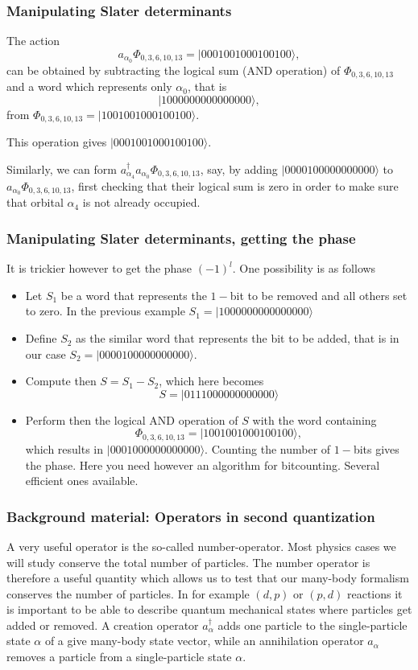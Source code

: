 \documentclass[compress]{beamer}
\begin{document}
\frame
{
  \frametitle{Manipulating Slater determinants}
\begin{small}
{\scriptsize
The action
\[
a_{\alpha_0}\Phi_{0,3,6,10,13} = |0001001000100100\rangle,
\]
can be obtained by subtracting the logical sum (AND operation) of $\Phi_{0,3,6,10,13}$ and 
a word which represents only $\alpha_0$, that is
\[
|1000000000000000\rangle,
\]  
from $\Phi_{0,3,6,10,13}= |1001001000100100\rangle$.

This operation gives $|0001001000100100\rangle$. 

Similarly, we can form $a^\dagger_{\alpha_4}a_{\alpha_0}\Phi_{0,3,6,10,13}$, say, by adding 
$|0000100000000000\rangle$ to $a_{\alpha_0}\Phi_{0,3,6,10,13}$, first checking that their logical sum
is zero in order to make sure that orbital $\alpha_4$ is not already occupied. 
}
\end{small}
}


\frame
{
  \frametitle{Manipulating Slater determinants, getting the phase}
\begin{small}
{\scriptsize
It is trickier however to get the phase $(-1)^l$. 
One possibility is as follows
\begin{itemize}
\item Let $S_1$ be a word that represents the $1-$bit to be removed and all others set to zero.
In the previous example $S_1=|1000000000000000\rangle$
\item Define $S_2$ as the similar word that represents the bit to be added, that is in our case
$S_2=|0000100000000000\rangle$.
\item Compute then $S=S_1-S_2$, which here becomes
\[
S=|0111000000000000\rangle
\]
\item Perform then the logical AND operation of $S$ with the word containing 
\[
\Phi_{0,3,6,10,13} = |1001001000100100\rangle,
\]
which results in $|0001000000000000\rangle$. Counting the number of $1-$bits gives the phase.  Here you need however an algorithm for bitcounting. Several efficient ones available. 
\end{itemize}
}
\end{small}
}





\frame
{
  \frametitle{Background material: Operators in second quantization}
\begin{small}
{\scriptsize
A very useful operator is the so-called number-operator.  Most physics cases  we will
study conserve the total number of particles.  The number operator is therefore
a useful quantity which allows us to test that our many-body formalism  conserves the number of particles.
In for example $(d,p)$ or $(p,d)$ reactions it is important to be able to describe quantum mechanical states
where particles get added or removed.
A creation operator $a_\alpha^\dagger$ adds one particle to the single-particle state
$\alpha$ of a give many-body state vector, while an annihilation operator $a_\alpha$ 
removes a particle from a single-particle
state $\alpha$. 
}
\end{small}
}
\end{document}
